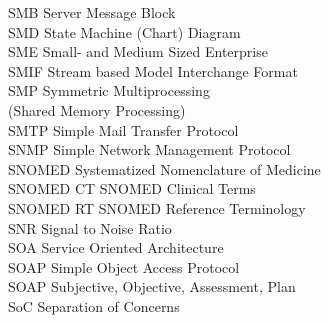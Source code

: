 \begin{tabbing}

    \>SMB \>\>Server Message Block\\

    \>SMD \>\>State Machine (Chart) Diagram\\

    \>SME \>\>Small- and Medium Sized Enterprise\\

    \>SMIF \>\>Stream based Model Interchange Format\\


    \>SMP \>\>Symmetric Multiprocessing\\
        \>\>\>(Shared Memory Processing)\\

    \>SMTP \>\>Simple Mail Transfer Protocol\\




    \>SNMP \>\>Simple Network Management Protocol\\

    \>SNOMED \>\>Systematized Nomenclature of Medicine\\

    \>SNOMED CT \>\>SNOMED Clinical Terms\\

    \>SNOMED RT \>\>SNOMED Reference Terminology\\

    \>SNR \>\>Signal to Noise Ratio\\

    \>SOA \>\>Service Oriented Architecture\\

    \>SOAP \>\>Simple Object Access Protocol\\

    \>SOAP \>\>Subjective, Objective, Assessment, Plan\\

    \>SoC \>\>Separation of Concerns\\



\end{tabbing}
